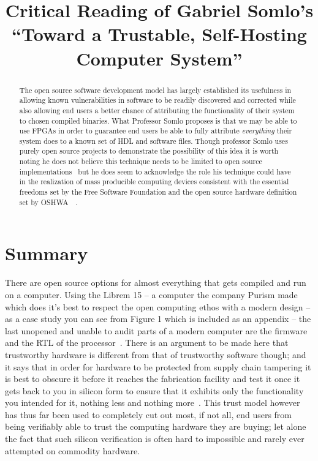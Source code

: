 \documentclass[conference]{IEEEtran}
\begin{document}
\title{Critical Reading of Gabriel Somlo's ``Toward a Trustable, Self-Hosting Computer System''}

\author{}
\author{}

\maketitle

\begin{abstract}
The open source software development model has largely established its usefulness in allowing known vulnerabilities in software to be readily discovered and corrected while also allowing end users a better chance of attributing the functionality of their system to chosen compiled binaries. What Professor Somlo proposes is that we may be able to use FPGAs in order to guarantee end users be able to fully attribute \textit{{everything}} their system does to a known set of HDL and software files. Though professor Somlo uses purely open source projects to demonstrate the possibility of this idea it is worth noting he does not believe this technique needs to be limited to open source implementations~\cite{Somlo} but he does seem to acknowledge the role his technique could have in the realization of mass producible computing devices consistent with the essential freedoms set by the Free Software Foundation and the open source hardware definition set by OSHWA~\cite{fsf}~\cite{oshwa}.
\end{abstract}

\section{Summary}
There are open source options for almost everything that gets compiled and run on a computer. Using the Librem 15 – a computer the company Purism made which does it’s best to respect the open computing ethos with a modern design – as a case study you can see from Figure 1 which is included as an appendix – the last unopened and unable to audit parts of a modern computer are the firmware and the RTL of the processor~\cite{bunnie}. There is an argument to be made here that trustworthy hardware is different from that of trustworthy software though; and it says that in order for hardware to be protected from supply chain tampering it is best to obscure it before it reaches the fabrication facility and test it once it gets back to you in silicon form to ensure that it exhibits only the functionality you intended for it, nothing less and nothing more~\cite{karri}. This trust model however has thus far been used to completely cut out most, if not all, end users from being verifiably able to trust the computing hardware they are buying; let alone the fact that such silicon verification is often hard to impossible and rarely ever attempted on commodity hardware.
\end{document}
